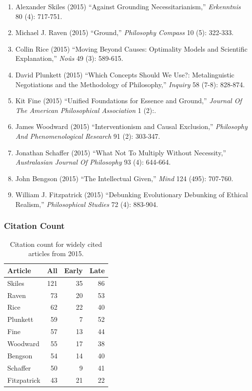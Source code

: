\documentclass[
  10pt,
  letterpaper,
  DIV=11,
  numbers=noendperiod,
  twoside]{scrartcl}
\providecommand{\tightlist}{%
  \setlength{\itemsep}{0pt}\setlength{\parskip}{0pt}}\usepackage{longtable,booktabs,array}
\begin{document}
\begin{enumerate}
\def\labelenumi{\arabic{enumi}.}
\tightlist
\item
  Alexander Skiles (2015) ``Against Grounding Necessitarianism,''
  \emph{Erkenntnis} 80 (4): 717-751.
\item
  Michael J. Raven (2015) ``Ground,'' \emph{Philosophy Compass} 10 (5):
  322-333.
\item
  Collin Rice (2015) ``Moving Beyond Causes: Optimality Models and
  Scientific Explanation,'' \emph{Noûs} 49 (3): 589-615.
\item
  David Plunkett (2015) ``Which Concepts Should We Use?: Metalinguistic
  Negotiations and the Methodology of Philosophy,'' \emph{Inquiry} 58
  (7-8): 828-874.
\item
  Kit Fine (2015) ``Unified Foundations for Essence and Ground,''
  \emph{Journal Of The American Philosophical Association} 1 (2):.
\item
  James Woodward (2015) ``Interventionism and Causal Exclusion,''
  \emph{Philosophy And Phenomenological Research} 91 (2): 303-347.
\item
  Jonathan Schaffer (2015) ``What Not To Multiply Without Necessity,''
  \emph{Australasian Journal Of Philosophy} 93 (4): 644-664.
\item
  John Bengson (2015) ``The Intellectual Given,'' \emph{Mind} 124 (495):
  707-760.
\item
  William J. Fitzpatrick (2015) ``Debunking Evolutionary Debunking of
  Ethical Realism,'' \emph{Philosophical Studies} 72 (4): 883-904.
\end{enumerate}

\subsubsection*{Citation Count}\label{sec-count-2015}

\begin{longtable}[]{@{}lrrr@{}}

\caption{\label{tbl-citation-count-2015}Citation count for widely cited
articles from 2015.}

\tabularnewline

\toprule\noalign{}
Article & All & Early & Late \\
\midrule\noalign{}
\endhead
\bottomrule\noalign{}
\endlastfoot
Skiles & 121 & 35 & 86 \\
Raven & 73 & 20 & 53 \\
Rice & 62 & 22 & 40 \\
Plunkett & 59 & 7 & 52 \\
Fine & 57 & 13 & 44 \\
Woodward & 55 & 17 & 38 \\
Bengson & 54 & 14 & 40 \\
Schaffer & 50 & 9 & 41 \\
Fitzpatrick & 43 & 21 & 22 \\

\end{longtable}
\end{document}
